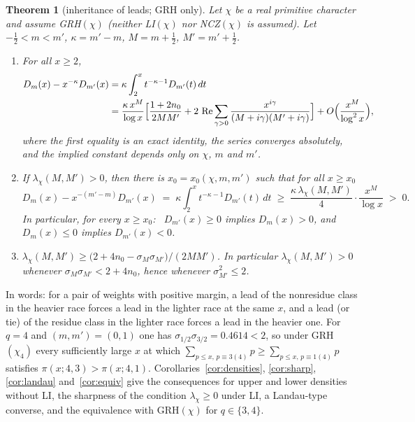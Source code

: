 \documentclass[11pt]{amsart}
\newtheorem{letterthm}{Theorem}
\theoremstyle{definition}
\numberwithin{equation}{section}
\newcommand{\re}{\operatorname{Re}}
\begin{document}
\begin{letterthm}[inheritance of leads; GRH only]\label{thm:A}
Let $\chi$ be a real primitive character and assume GRH$(\chi)$
(neither LI$(\chi)$ nor NCZ$(\chi)$ is assumed). Let
$-\tfrac12<m<m'$, $\kappa=m'-m$, $M=m+\tfrac12$, $M'=m'+\tfrac12$.
\begin{enumerate}
\item[(i)] For all $x\ge2$,
\begin{align*}
D_m(x)-x^{-\kappa}D_{m'}(x)
&=\kappa\int_2^x t^{-\kappa-1}D_{m'}(t)\,dt\\
&=\frac{\kappa\,x^{M}}{\log x}\Bigl[\frac{1+2n_0}{2MM'}
+2\,\re\sum_{\gamma>0}\frac{x^{i\gamma}}{(M+i\gamma)(M'+i\gamma)}\Bigr]
+O\Bigl(\frac{x^{M}}{\log^2x}\Bigr),
\end{align*}
where the first equality is an exact identity, the series converges
absolutely, and the implied constant depends only on $\chi$, $m$ and
$m'$.
\item[(ii)] If $\lambda_\chi(M,M')>0$, then there is
$x_0=x_0(\chi,m,m')$ such that for all $x\ge x_0$
\[
D_m(x)-x^{-(m'-m)}D_{m'}(x)
\;=\;\kappa\int_2^x t^{-\kappa-1}D_{m'}(t)\,dt
\;\ge\;\frac{\kappa\,\lambda_\chi(M,M')}{4}\cdot\frac{x^{M}}{\log x}\;>\;0 .
\]
In particular, for every $x\ge x_0$: \ $D_{m'}(x)\ge0$ implies
$D_m(x)>0$, and $D_m(x)\le0$ implies $D_{m'}(x)<0$.
\item[(iii)] $\lambda_\chi(M,M')\ge
\bigl(2+4n_0-\sigma_M\sigma_{M'}\bigr)/(2MM')$. In particular
$\lambda_\chi(M,M')>0$ whenever $\sigma_M\sigma_{M'}<2+4n_0$, hence
whenever $\sigma_{M'}^2\le2$.
\end{enumerate}
\end{letterthm}

In words: for a pair of weights with positive margin, a lead of the
nonresidue class in the heavier race forces a lead in the lighter
race at the same $x$, and a lead (or tie) of the residue class in the
lighter race forces a lead in the heavier one. For $q=4$ and
$(m,m')=(0,1)$ one has $\sigma_{1/2}\sigma_{3/2}=0.4614<2$, so under
GRH$(\chi_4)$ every sufficiently large $x$ at which
$\sum_{p\le x,\,p\equiv3(4)}p\ge\sum_{p\le x,\,p\equiv1(4)}p$ satisfies
$\pi(x;4,3)>\pi(x;4,1)$. Corollaries~\ref{cor:densities},
\ref{cor:sharp}, \ref{cor:landau} and~\ref{cor:equiv} give the
consequences for upper and lower densities without LI, the sharpness
of the condition $\lambda_\chi\ge0$ under LI, a Landau-type converse,
and the equivalence with GRH$(\chi)$ for $q\in\{3,4\}$.
\end{document}
